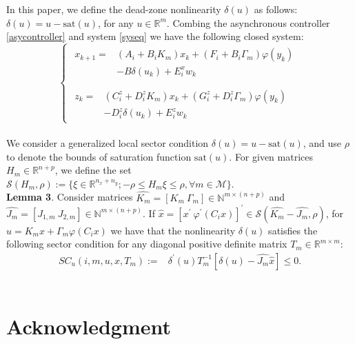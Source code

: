 \documentclass[conference]{IEEEtran}
\begin{document}
In this paper, we define the dead-zone nonlinearity $\delta(u)$ as follows:$\delta(u)=u-\mathrm{sat}(u)$, for any $u\in\mathbb{R}^{m}$. Combing the asynchronous controller \eqref{asycontroller} and system \eqref{syseq} we have the following closed system:
\begin{equation}\label{close_system_equation}
\left\{
\begin{array}{lr}
\begin{split}
x_{k+1}=&(A_i+B_iK_m)x_k+(F_i+B_i\varGamma_m)\varphi(y_k)\\
		&-B\delta(u_k)+E_i^xw_k\\
\end{split}
\\
\begin{split}
z_k=&(C^z_i+D_i^zK_m)x_k+(G^z_i+D^z_i\varGamma_m)\varphi(y_k)\\
&-D_i^z\delta(u_k)+E^z_iw_k
\end{split}
\end{array}
\right.
\end{equation} 
\\
We consider a generalized local sector condition $\delta(u)=u-\mathrm{sat}(u)$, and use $\rho$ to denote the bounds of saturation function $\mathrm{sat}(u)$. For given matrices $H_m\in\mathbb{R}^{n+p}$, we define the set $\mathcal{S}(H_m,\rho):=\{\xi\in\mathbb{R}^{n_x+n_y};-\rho\leq H_m\xi\leq\rho, \forall m\in \mathcal{M} \}$.
\\
\textbf{Lemma 3}. Consider matrices $\widehat{K_m}=[K_m \ \varGamma_m]\in\mathbb{N}^{m\times(n+p)}$ and $\widehat{J_m}=[J_{1,m} \ J_{2,m}]\in\mathbb{N}^{m\times(n+p)}$. If $\widehat{x}=[x^{'} \ \varphi^{'}(C_ix) ]^{'} \in \mathcal{S}(\widehat{K_m}-\widehat{J_m},\rho)$, for $u=K_mx+\varGamma_m\varphi(C_ix)$ we have that the nonlinearity $\delta(u)$ satisfies the following sector condition for any diagonal positive definite matrix $T_m\in\mathbb{R}^{m\times m}$:
\begin{equation}
\begin{split}
SC_u(i,m,u,x,T_m):= &\delta^{'}(u)T_m^{-1}[\delta(u)-\widehat{J_m}\widehat{x}]\leq 0.
\end{split}
\end{equation}
\\





\section*{Acknowledgment}
\end{document}
